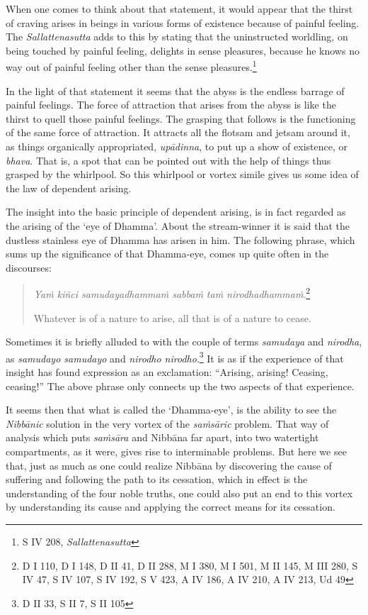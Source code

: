 When one comes to think about that statement, it would appear that the thirst of craving arises in beings in various forms of existence because of painful feeling. The \emph{Sallattenasutta} adds to this by stating that the uninstructed worldling, on being touched by painful feeling, delights in sense pleasures, because he knows no way out of painful feeling other than the sense pleasures.\footnote{S IV 208, \emph{Sallattenasutta}}

In the light of that statement it seems that the abyss is the endless barrage of painful feelings. The force of attraction that arises from the abyss is like the thirst to quell those painful feelings. The grasping that follows is the functioning of the same force of attraction. It attracts all the flotsam and jetsam around it, as things organically appropriated, \emph{upādinna}, to put up a show of existence, or \emph{bhava}. That is, a spot that can be pointed out with the help of things thus grasped by the whirlpool. So this whirlpool or vortex simile gives us some idea of the law of dependent arising.

The insight into the basic principle of dependent arising, is in fact regarded as the arising of the `eye of Dhamma'. About the stream-winner it is said that the dustless stainless eye of Dhamma has arisen in him. The following phrase, which sums up the significance of that Dhamma-eye, comes up quite often in the discourses:

\begin{quote}
\emph{Yaṁ kiñci samudayadhammaṁ sabbaṁ taṁ nirodhadhammaṁ}.\footnote{D I 110, D I 148, D II 41, D II 288, M I 380, M I 501, M II 145, M III 280, S IV 47, S IV 107, S IV 192, S V 423, A IV 186, A IV 210, A IV 213, Ud 49}

Whatever is of a nature to arise, all that is of a nature to cease.
\end{quote}

Sometimes it is briefly alluded to with the couple of terms \emph{samudaya} and \emph{nirodha}, as \emph{samudayo samudayo} and \emph{nirodho nirodho}.\footnote{D II 33, S II 7, S II 105} It is as if the experience of that insight has found expression as an exclamation: ``Arising, arising! Ceasing, ceasing!'' The above phrase only connects up the two aspects of that experience.

It seems then that what is called the `Dhamma-eye', is the ability to see the \emph{Nibbānic} solution in the very vortex of the \emph{saṁsāric} problem. That way of analysis which puts \emph{saṁsāra} and Nibbāna far apart, into two watertight compartments, as it were, gives rise to interminable problems. But here we see that, just as much as one could realize Nibbāna by discovering the cause of suffering and following the path to its cessation, which in effect is the understanding of the four noble truths, one could also put an end to this vortex by understanding its cause and applying the correct means for its cessation.

